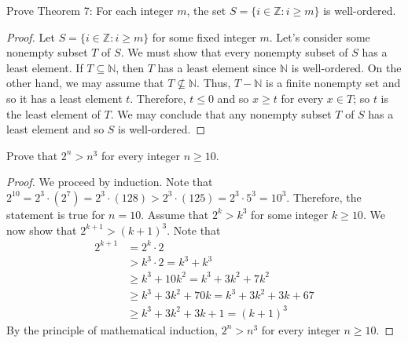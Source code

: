\documentclass[12pt]{article}
\newcommand{\N}{\mathbb{N}}
\newcommand{\Z}{\mathbb{Z}}
\newenvironment{problem}[2][Problem]{\begin{trivlist}
		\item[\hskip \labelsep {\bfseries #1}\hskip \labelsep {\bfseries #2.}]}{\end{trivlist}}
\begin{document}
\begin{problem}{17}
	Prove Theorem 7: For each integer $m$, the set $S = \{i\in \Z: i\geq m\}$ is well-ordered.
	\begin{proof}
		Let $S = \{i\in \Z: i\geq m\}$ for some fixed integer $m$. Let's consider some nonempty subset $T$ of $S$. We must show that every nonempty subset of $S$ has a least element. If $T\subseteq \N$, then $T$ has a least element since $\N$ is well-ordered. On the other hand, we may assume that $T\not\subseteq \N$. Thus, $T-\N$ is a finite nonempty set and so it has a least element $t$. Therefore, $t\leq 0$ and so $x\geq t$ for every $x\in T$; so $t$ is the least element of $T$. We may conclude that any nonempty subset $T$ of $S$ has a least element and so $S$ is well-ordered.
	\end{proof}
\end{problem} 

\begin{problem}{18}
	Prove that $2^{n}>n^{3}$ for every integer $n\geq 10$.
	\begin{proof}
		We proceed by induction. Note that $2^{10} = 2^{3}\cdot (2^{7}) = 2^{3}\cdot(128) > 2^{3}\cdot (125) = 2^{3}\cdot 5^{3} = 10^{3}$. Therefore, the statement is true for $n=10$. Assume that $2^{k}>k^{3}$ for some integer $k\geq 10$. We now show that $2^{k+1}>(k+1)^{3}$. Note that 
		\begin{align*}
			2^{k+1} &= 2^{k}\cdot 2\\
			&> k^{3}\cdot 2 = k^{3}+k^{3}\\
			&\geq k^{3}+10k^{2} = k^{3}+3k^{2}+7k^{2}\\
			&\geq k^{3}+3k^{2}+70k = k^{3}+3k^{2}+3k + 67\\
			&\geq k^{3}+3k^{2}+3k+1 = (k+1)^{3}
		\end{align*}
	By the principle of mathematical induction, $2^{n}>n^{3}$ for every integer $n\geq 10$.
	\end{proof}
\end{problem}
\end{document}
